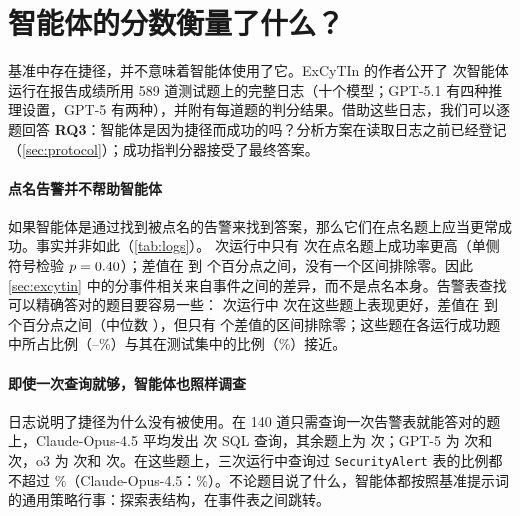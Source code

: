 \section{智能体的分数衡量了什么？}
\label{sec:scores}

基准中存在捷径，并不意味着智能体使用了它。ExCyTIn 的作者公开了 \lgModels{} 次智能体运行在报告成绩所用 589 道测试题上的完整日志（十个模型；GPT-5.1 有四种推理设置，GPT-5 有两种），并附有每道题的判分结果。借助这些日志，我们可以逐题回答 \textbf{RQ3}：智能体是因为捷径而成功的吗？分析方案在读取日志之前已经登记（\cref{sec:protocol}）；成功指判分器接受了最终答案。

\begin{table}[t]
  \caption{题目点名答案所在告警时，智能体并不更常成功。每次公开运行在 589 道 ExCyTIn 测试题上的成功率（\%）：全部题目；点名终点告警的题（337）与其余题（252），以及两者之差和 95\% 区间（按事件重抽）；告警表查找可精确答对的题（"Lookup"，140）；抗捷径题（"Resist."，\lgResN：未点名，且两种查找都答不对），括号内为该运行在这些题上的排名。按总成功率排序。}
  \label{tab:logs}
  \centering\footnotesize
  
\end{table}

\paragraph{点名告警并不帮助智能体} 如果智能体是通过找到被点名的告警来找到答案，那么它们在点名题上应当更常成功。事实并非如此（\cref{tab:logs}）。\lgModels{} 次运行中只有 \lgPos{} 次在点名题上成功率更高（单侧符号检验 $p=0.40$）；差值在 \lgDmin{} 到 \lgDmax{} 个百分点之间，没有一个区间排除零。因此 \cref{sec:excytin} 中的分事件相关来自事件之间的差异，而不是点名本身。告警表查找可以精确答对的题目要容易一些：\lgModels{} 次运行中 \lgTPos{} 次在这些题上表现更好，差值在 \lgTmin{} 到 \lgTmax{} 个百分点之间（中位数 \lgTmedian），但只有 \lgTCI{} 个差值的区间排除零；这些题在各运行成功题中所占比例（\lgShareMin--\lgShareMax\%）与其在测试集中的比例（\oTable\%）接近。

\paragraph{即使一次查询就够，智能体也照样调查} 日志说明了捷径为什么没有被使用。在 140 道只需查询一次告警表就能答对的题上，Claude-Opus-4.5 平均发出 \tcOpusStepsLookup{} 次 SQL 查询，其余题上为 \tcOpusStepsOther{} 次；GPT-5 为 \tcGFiveStepsLookup{} 次和 \tcGFiveStepsOther{} 次，o3 为 \tcOThreeStepsLookup{} 次和 \tcOThreeStepsOther{} 次。在这些题上，三次运行中查询过 \texttt{SecurityAlert} 表的比例都不超过 \tcMaxAlertTable\%（Claude-Opus-4.5：\tcOpusAlertTable\%）。不论题目说了什么，智能体都按照基准提示词的通用策略行事：探索表结构，在事件表之间跳转。

